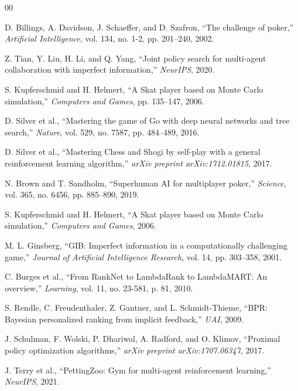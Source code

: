 \documentclass[conference]{IEEEtran}
\begin{document}
\begin{thebibliography}{00}

D. Billings, A. Davidson, J. Schaeffer, and D. Szafron, ``The challenge of poker,'' \textit{Artificial Intelligence}, vol. 134, no. 1-2, pp. 201--240, 2002.

Z. Tian, Y. Liu, H. Li, and Q. Yang, ``Joint policy search for multi-agent collaboration with imperfect information,'' \textit{NeurIPS}, 2020.

S. Kupferschmid and H. Helmert, ``A Skat player based on Monte Carlo simulation,'' \textit{Computers and Games}, pp. 135--147, 2006.

D. Silver et al., ``Mastering the game of Go with deep neural networks and tree search,'' \textit{Nature}, vol. 529, no. 7587, pp. 484--489, 2016.

D. Silver et al., ``Mastering Chess and Shogi by self-play with a general reinforcement learning algorithm,'' \textit{arXiv preprint arXiv:1712.01815}, 2017.

N. Brown and T. Sandholm, ``Superhuman AI for multiplayer poker,'' \textit{Science}, vol. 365, no. 6456, pp. 885--890, 2019.

S. Kupferschmid and H. Helmert, ``A Skat player based on Monte Carlo simulation,'' \textit{Computers and Games}, 2006.

M. L. Ginsberg, ``GIB: Imperfect information in a computationally challenging game,'' \textit{Journal of Artificial Intelligence Research}, vol. 14, pp. 303--358, 2001.

C. Burges et al., ``From RankNet to LambdaRank to LambdaMART: An overview,'' \textit{Learning}, vol. 11, no. 23-581, p. 81, 2010.

S. Rendle, C. Freudenthaler, Z. Gantner, and L. Schmidt-Thieme, ``BPR: Bayesian personalized ranking from implicit feedback,'' \textit{UAI}, 2009.

J. Schulman, F. Wolski, P. Dhariwal, A. Radford, and O. Klimov, ``Proximal policy optimization algorithms,'' \textit{arXiv preprint arXiv:1707.06347}, 2017.

J. Terry et al., ``PettingZoo: Gym for multi-agent reinforcement learning,'' \textit{NeurIPS}, 2021.

\end{thebibliography}
\end{document}
